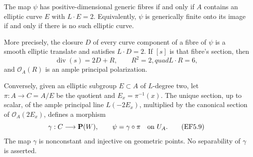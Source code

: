 \begin{proposition}
\label{prop:DE-five-evaluation-fibre-dichotomy}
The map \(\psi\) has positive-dimensional generic fibres if
and only if \(A\) contains an elliptic curve \(E\) with
\(L\cdot E=2\). Equivalently, \(\psi\) is generically finite
onto its image if and only if there is no such elliptic curve.

More precisely, the closure \(D\) of every curve component of
a fibre of \(\psi\) is a smooth elliptic translate and satisfies
\(L\cdot D=2\). If \([s]\) is that fibre's section, then
\[
               \operatorname{div}(s)=2D+R,
        \qquad R^2=2,quad L\cdot R=6,
 \tag{EF5.8}
\]
and \(\mathcal O_A(R)\) is an ample principal polarization.

Conversely, given an elliptic subgroup \(E\subset A\) of
\(L\)-degree two, let \(\pi:A\to C=A/E\) be the quotient
and \(E_x=\pi^{-1}(x)\). The unique section, up to scalar, of
the ample principal line \(L(-2E_x)\), multiplied by the
canonical section of \(\mathcal O_A(2E_x)\), defines a
morphism
\[
          \gamma:C\longrightarrow\mathbf P(W),
        \qquad \psi=\gamma\circ\pi\quad\hbox{on }U_A.
 \tag{EF5.9}
\]
The map \(\gamma\) is nonconstant and injective on geometric
points. No separability of \(\gamma\) is asserted.
\end{proposition}
